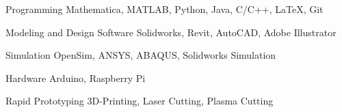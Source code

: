 

\begin{cvskills}

  \cvskill
    {Programming} %
    {Mathematica, MATLAB, Python, Java, C/C++, LaTeX, Git} %

  \cvskill
    {Modeling and Design Software} %
    {Solidworks, Revit, AutoCAD, Adobe Illustrator} %

  \cvskill
    {Simulation} %
    {OpenSim, ANSYS, ABAQUS, Solidworks Simulation} %

  \cvskill
    {Hardware} %
    {Arduino, Raspberry Pi} %
    
  \cvskill
    {Rapid Prototyping} %
    {3D-Printing, Laser Cutting, Plasma Cutting} %

\end{cvskills}
